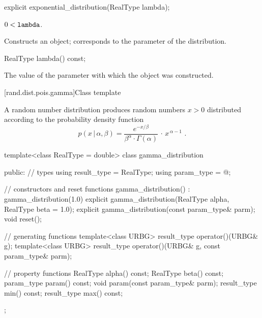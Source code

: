 %
\begin{itemdecl}
explicit exponential_distribution(RealType lambda);
\end{itemdecl}

\begin{itemdescr}
\pnum
\requires $0 < \texttt{lambda}$.

\pnum
\effects Constructs an  object;
 corresponds to the parameter of the distribution.
\end{itemdescr}

%
\begin{itemdecl}
RealType lambda() const;
\end{itemdecl}

\begin{itemdescr}
\pnum\returns The value of the  parameter
 with which the object was constructed.
\end{itemdescr}


[rand.dist.pois.gamma]{Class template }%
%
%

\pnum
A  random number distribution
produces random numbers $x > 0$
distributed according to
the probability density function%
%
%
\[ p(x\,|\,\alpha,\beta) =
     \frac{e^{-x/\beta}}{\beta^{\alpha} \cdot \Gamma(\alpha)} \, \cdot \, x^{\, \alpha-1}
     \text{ .} \]

%
\begin{codeblock}
template<class RealType = double>
  class gamma_distribution {
  public:
    // types
    using result_type = RealType;
    using param_type  = @\unspec@;

    // constructors and reset functions
    gamma_distribution() : gamma_distribution(1.0) {}
    explicit gamma_distribution(RealType alpha, RealType beta = 1.0);
    explicit gamma_distribution(const param_type& parm);
    void reset();

    // generating functions
    template<class URBG>
      result_type operator()(URBG& g);
    template<class URBG>
      result_type operator()(URBG& g, const param_type& parm);

    // property functions
    RealType alpha() const;
    RealType beta() const;
    param_type param() const;
    void param(const param_type& parm);
    result_type min() const;
    result_type max() const;
  };
\end{codeblock}


